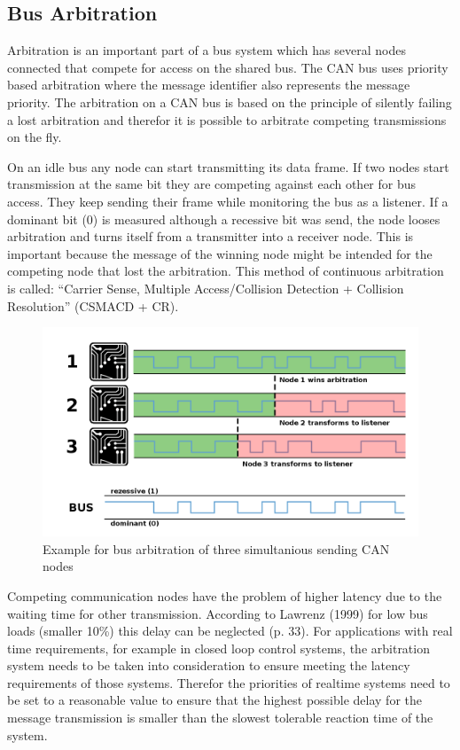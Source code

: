         
	\subsection{Bus Arbitration}
	Arbitration is an important part of a bus system which has several nodes
	connected that compete for access on the shared bus. The CAN bus uses
	priority based arbitration where the message identifier also represents the
	message priority. The arbitration on a CAN bus is based on the principle of
	silently failing a lost arbitration and therefor it is possible to arbitrate
	competing transmissions on the fly. 
	
	On an idle bus any node can start transmitting its data frame. If two nodes
	start transmission at the same bit they are competing against each other for
	bus access.
	They keep sending their frame while monitoring the bus as a listener. If a dominant
	bit (0) is measured although a recessive bit was send, the node looses
	arbitration and turns itself from a transmitter into a receiver node. This is
	important because the message of the winning node might be intended for the
	competing node that lost the arbitration. This method of continuous arbitration is called: ``Carrier Sense,
	Multiple Access/Collision Detection + Collision Resolution'' (CSMACD + CR).
	
	\begin{figure}[htb] \centering
		\includegraphics[width=1\textwidth]{content/pictures/arbitration.png}
		\caption{Example for bus arbitration of three simultanious sending CAN nodes}
		\label{fig:arbitration}
	\end{figure}
	
	Competing communication nodes have the problem of higher latency due to the
	waiting time for other transmission. According to Lawrenz (1999)
	\cite{canbook-lawrenz} for low bus loads (smaller 10\%) this delay can be
	neglected (p.
	33).
	For applications with real time requirements, for example in closed loop
	control systems, the arbitration system needs to be taken into consideration to ensure
	meeting the latency requirements of those systems. Therefor the priorities of
	realtime systems need to be set to a reasonable value to ensure that the
	highest possible delay for the message transmission is smaller than the
	slowest tolerable reaction time of the system.
	
